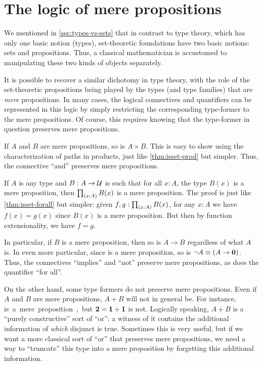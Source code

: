 \section{The logic of mere propositions}
\label{subsec:logic-hprop}

%
We mentioned in \autoref{sec:types-vs-sets} that in contrast to type theory, which has only one basic notion (types), set-theoretic foundations have two basic notions: sets and propositions.
Thus, a classical mathematician is accustomed to manipulating these two kinds of objects separately.

It is possible to recover a similar dichotomy in type theory, with the role of the set-theoretic propositions being played by the types (and type families) that are \emph{mere} propositions.
In many cases, the logical connectives and quantifiers can be represented in this logic by simply restricting the corresponding type-former to the mere propositions.
Of course, this requires knowing that the type-former in question preserves mere propositions.

\begin{eg}
  If $A$ and $B$ are mere propositions, so is $A\times B$.
  This is easy to show using the characterization of paths in products, just like \autoref{thm:isset-prod} but simpler.
  Thus, the connective ``and'' preserves mere propositions.
\end{eg}

\begin{eg}\label{thm:isprop-forall}
  If $A$ is any type and $B:A\to \mathcal{U}$ is such that for all $x:A$, the type $B(x)$ is a mere proposition, then $\prd{x:A} B(x)$ is a mere proposition.
  The proof is just like \autoref{thm:isset-forall} but simpler: given $f,g:\prd{x:A} B(x)$, for any $x:A$ we have $f(x)=g(x)$ since $B(x)$ is a mere proposition.
  But then by function extensionality, we have $f=g$.

  In particular, if $B$ is a mere proposition, then so is $A\to B$ regardless of what $A$ is.
  In even more particular, since \emptyt is a mere proposition, so is $\neg A \equiv (A\to\mathbf{0})$.
  Thus, the connectives ``implies'' and ``not'' preserve mere propositions, as does the quantifier ``for all''.
\end{eg}

On the other hand, some type formers do not preserve mere propositions.
Even if $A$ and $B$ are mere propositions, $A+B$ will not in general be.
For instance, \unit is a mere proposition, but $\mathbf{2}=\mathbf{1}+\mathbf{1}$ is not.
Logically speaking, $A+B$ is a ``purely constructive'' sort of ``or'': a witness of it contains the additional information of \emph{which} disjunct is true.
Sometimes this is very useful, but if we want a more classical sort of ``or'' that preserves mere propositions, we need a way to ``truncate'' this type into a mere proposition by forgetting this additional information.

